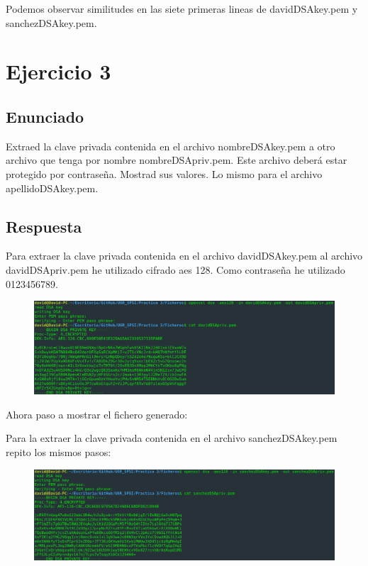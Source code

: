 \documentclass[10pt,a4paper,spanish]{report}
\begin{document}
\noindent
Podemos observar similitudes en las siete primeras lineas de davidDSAkey.pem y sanchezDSAkey.pem.

\chapter{Ejercicio 3}

\section{Enunciado}
\noindent
Extraed la clave privada contenida en el archivo nombreDSAkey.pem a otro archivo que tenga por nombre nombreDSApriv.pem. Este archivo deberá estar protegido por contraseña. Mostrad sus valores. Lo mismo para el archivo apellidoDSAkey.pem.

\section{Respuesta}
\noindent
Para extraer la clave privada contenida en el archivo davidDSAkey.pem al archivo davidDSApriv.pem he utilizado cifrado aes 128. Como contraseña he utilizado 0123456789.

\begin{figure}[!hbp]
 \centering  \includegraphics[width=1\textwidth]{./Imagenes/3_0.png}
\end{figure}

\noindent
Ahora paso a mostrar el fichero generado:

\newpage
\noindent
Para la extraer la clave privada contenida en el archivo sanchezDSAkey.pem repito los mismos pasos:

\begin{figure}[!hbp]
 \centering  \includegraphics[width=1\textwidth]{./Imagenes/3_2.png}
\end{figure}
\end{document}
